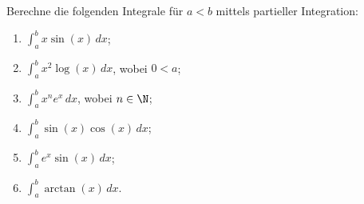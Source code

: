 \begin{prob} 
Berechne die folgenden Integrale f\"ur $a<b$ mittels partieller Integration:

\begin{enumerate}[label=(\alph*)]
\item $\int_a^b x\sin(x)\,dx$;
\item $\int_a^b x^2\log(x)\,dx$, wobei $0<a$;
\item $\int_a^b x^n e^x\,dx$, wobei $n\in\N$;
\item $\int_a^b \sin(x)\cos(x)\,dx$;
\item $\int_a^b e^x\sin(x)\,dx$;
\item $\int_a^b \arctan(x)\,dx$.
\end{enumerate}
\end{prob}

